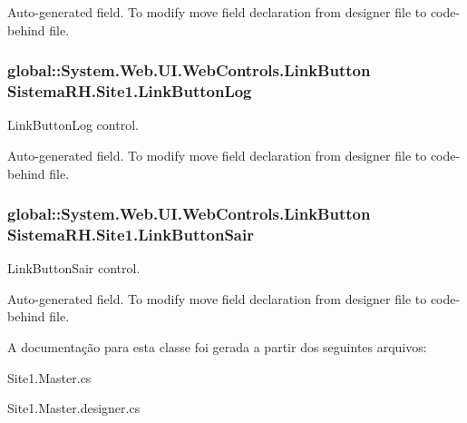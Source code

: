 Auto-\/generated field. To modify move field declaration from designer file to code-\/behind file. \hypertarget{class_sistema_r_h_1_1_site1_aefccf7ce2dd552821210010a288905e8}{
\subsubsection[{LinkButtonLog}]{\setlength{\rightskip}{0pt plus 5cm}global::System.Web.UI.WebControls.LinkButton {\bf SistemaRH.Site1.LinkButtonLog}}}
\label{class_sistema_r_h_1_1_site1_aefccf7ce2dd552821210010a288905e8}


LinkButtonLog control. 

Auto-\/generated field. To modify move field declaration from designer file to code-\/behind file. \hypertarget{class_sistema_r_h_1_1_site1_a8ea66e9b8c9d558362fbcc038e0148fc}{
\subsubsection[{LinkButtonSair}]{\setlength{\rightskip}{0pt plus 5cm}global::System.Web.UI.WebControls.LinkButton {\bf SistemaRH.Site1.LinkButtonSair}}}
\label{class_sistema_r_h_1_1_site1_a8ea66e9b8c9d558362fbcc038e0148fc}


LinkButtonSair control. 

Auto-\/generated field. To modify move field declaration from designer file to code-\/behind file. 

A documentação para esta classe foi gerada a partir dos seguintes arquivos:\begin{DoxyCompactItemize}
\item 
Site1.Master.cs\item 
Site1.Master.designer.cs\end{DoxyCompactItemize}
